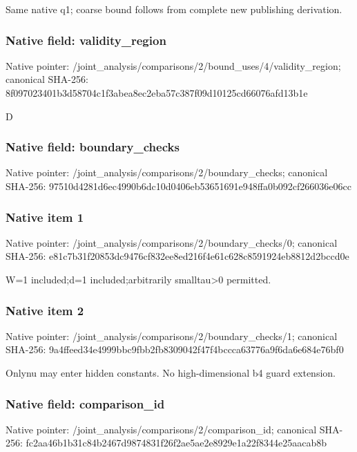 \documentclass[10pt,a4paper]{article}
\begin{document}
\begingroup\raggedright\sloppy Same native q1;\allowbreak{} coarse bound follows from complete new publishing derivation.\par\endgroup

\subsubsection{Native field: validity\_\allowbreak{}region}
Native pointer: /joint\_\allowbreak{}analysis/comparisons/2/bound\_\allowbreak{}uses/4/validity\_\allowbreak{}region; canonical SHA-256: 8f097023401b3d58704c1f3abea8ec2eba57c387f09d10125cd66076afd13b1e

\begingroup\raggedright\sloppy D\par\endgroup

\subsubsection{Native field: boundary\_\allowbreak{}checks}
Native pointer: /joint\_\allowbreak{}analysis/comparisons/2/boundary\_\allowbreak{}checks; canonical SHA-256: 97510d4281d6ec4990b6dc10d0406eb53651691e948ffa0b092cf266036e06cc

\subsubsection{Native item 1}
Native pointer: /joint\_\allowbreak{}analysis/comparisons/2/boundary\_\allowbreak{}checks/0; canonical SHA-256: e81c7b31f20853dc9476cf832ee8ed216f4e61c628c8591924eb8812d2bccd0e

\begingroup\raggedright\sloppy W=\allowbreak{}1 included;\allowbreak{}d=\allowbreak{}1 included;\allowbreak{}arbitrarily smalltau>0 permitted.\par\endgroup

\subsubsection{Native item 2}
Native pointer: /joint\_\allowbreak{}analysis/comparisons/2/boundary\_\allowbreak{}checks/1; canonical SHA-256: 9a4ffeed34e4999bbc9fbb2fb8309042f47f4bccca63776a9f6da6e684e76bf0

\begingroup\raggedright\sloppy Onlynu may enter hidden constants. No high-dimensional b4 guard extension.\par\endgroup

\subsubsection{Native field: comparison\_\allowbreak{}id}
Native pointer: /joint\_\allowbreak{}analysis/comparisons/2/comparison\_\allowbreak{}id; canonical SHA-256: fc2aa46b1b31c84b2467d9874831f26f2ae5ae2e8929e1a22f8344e25aacab8b
\end{document}

